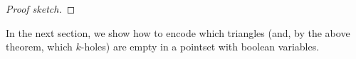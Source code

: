 \begin{proof}[Proof sketch]
\end{proof}

In the next section,
we show how to encode which triangles (and, by the above theorem, which $k$-holes) are empty in a pointset with boolean variables.